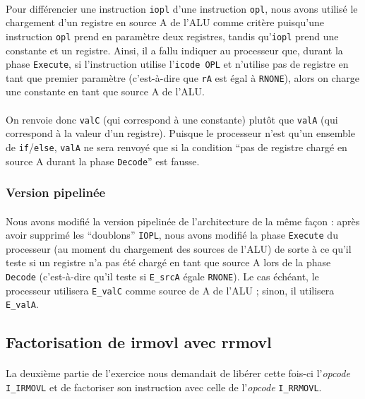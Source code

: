 \documentclass[12pt]{article}
\begin{document}
\paragraph{}Pour différencier une instruction \verb+iopl+ d'une instruction \verb+opl+, nous avons utilisé le chargement d'un registre en source A de l'ALU comme critère puisqu'une instruction \verb+opl+ prend en paramètre deux registres, tandis qu'\verb+iopl+ prend une constante et un registre. Ainsi, il a fallu indiquer au processeur que, durant la phase \verb+Execute+, si l'instruction utilise l'\verb+icode OPL+ et n'utilise pas de registre en tant que premier paramètre (c'est-à-dire que \verb+rA+ est égal à \verb+RNONE+), alors on charge une constante en tant que source A de l'ALU.

\paragraph{}On renvoie donc \verb+valC+ (qui correspond à une constante) plutôt que \verb+valA+ (qui correspond à la valeur d'un registre). Puisque le processeur n'est qu'un ensemble de \verb+if+/\verb+else+, \verb+valA+ ne sera renvoyé que si la condition ``pas de registre chargé en source A durant la phase \verb+Decode+'' est fausse.

\subsubsection{Version pipelinée}
\paragraph{}Nous avons modifié la version pipelinée de l'architecture de la même façon : après avoir supprimé les ``doublons'' \verb+IOPL+, nous avons modifié la phase \verb+Execute+ du processeur (au moment du chargement des sources de l'ALU) de sorte à ce qu'il teste si un registre n'a pas été chargé en tant que source A lors de la phase \verb+Decode+ (c'est-à-dire qu'il teste si \verb+E_srcA+ égale \verb+RNONE+). Le cas échéant, le processeur utilisera \verb+E_valC+ comme source de A de l'ALU ; sinon, il utilisera \verb+E_valA+.



\subsection{Factorisation de irmovl avec rrmovl}
\paragraph{}La deuxième partie de l'exercice nous demandait de libérer cette fois-ci l'{\itshape opcode} \verb+I_IRMOVL+ et de factoriser son instruction avec celle de l'{\itshape opcode} \verb+I_RRMOVL+.
\end{document}
